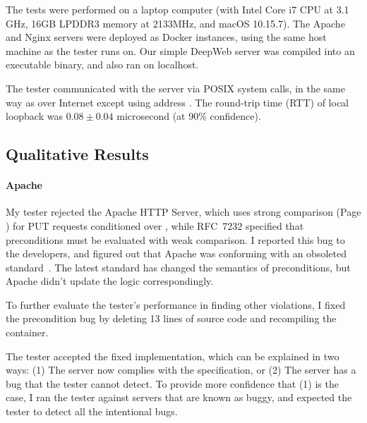 The tests were performed on a laptop computer (with Intel Core i7 CPU at 3.1
GHz, 16GB LPDDR3 memory at 2133MHz, and macOS 10.15.7).  The Apache and Nginx
servers were deployed as Docker instances, using the same host machine as the
tester runs on.  Our simple DeepWeb server was compiled into an executable
binary, and also ran on localhost.

The tester communicated with the server via POSIX system calls, in the same way
as over Internet except using address .  The round-trip time
(RTT) of local loopback was $0.08\pm0.04$ microsecond (at 90\% confidence).

\subsection{Qualitative Results}
\label{sec:http-qual}
\paragraph{Apache}
My tester rejected the Apache HTTP Server, which uses strong comparison
(Page \pageref{foot:etag}) for PUT requests conditioned
over , while RFC~7232 specified that
 preconditions must be evaluated with weak comparison.  I
reported this bug to the developers, and figured out that Apache was conforming
with an obsoleted \http standard~\cite{rfc2616}.  The latest standard has
changed the semantics of  preconditions, but Apache
didn't update the logic correspondingly.

To further evaluate the tester's performance in finding other violations, I
fixed the precondition bug by deleting 13 lines of source code and recompiling
the container.

The tester accepted the fixed implementation, which can be explained in two
ways: (1) The server now complies with the specification, or (2) The server has
a bug that the tester cannot detect.  To provide more confidence that (1) is the
case, I ran the tester against servers that are known as buggy, and expected the
tester to detect all the intentional bugs.

